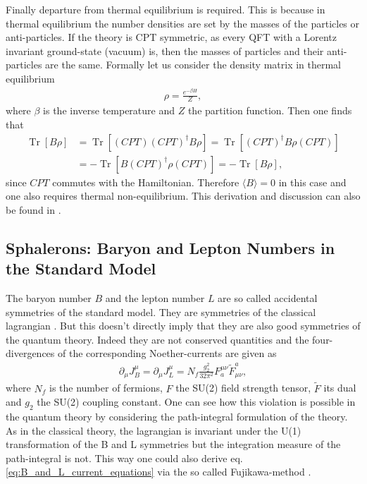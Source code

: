 \documentclass[13pt,a4paper,titlepage]{article}
\newcommand{\Tr}{\operatorname{Tr}}
\begin{document}
\noindent
Finally departure from thermal equilibrium is required. This is because in thermal equilibrium the number densities are set by the
masses of the particles or anti-particles. If the theory is CPT symmetric, as every QFT with a Lorentz invariant ground-state (vacuum) is, then the
masses of particles and their anti-particles are the same. %
Formally let us consider the density matrix in thermal equilibrium
\begin{align}
    \rho = \frac{e^{- \beta H}}{Z},
\end{align}
where $\beta$ is the inverse temperature and $Z$ the partition function.
Then one finds that
\begin{align}
    \Tr [ B \rho ] &=  \Tr [ (CPT) (CPT)^\dagger B \rho ] = \Tr [ (CPT)^\dagger B \rho (CPT) ]  \\
                   &= - \Tr [ B (CPT)^\dagger \rho (CPT) ] = - \Tr [ B \rho ],
\end{align}
since $CPT$ commutes with the Hamiltonian. Therefore $\langle B \rangle = 0$ in this case and one also requires thermal non-equilibrium. This derivation and discussion can also be found in \cite[sec. II]{Trodden:2004mj_baryogenesis_and_leptogenesis}.


\subsection{Sphalerons: Baryon and Lepton Numbers in the Standard Model}
\label{sec:sphaelrons}

The baryon number $B$ and the lepton number $L$ are so called accidental
symmetries of the standard model. They are symmetries of the classical lagrangian
\cite[part II.B]{Trodden:2004mj_baryogenesis_and_leptogenesis}.
But this doesn't directly imply that they are also good symmetries of the
quantum theory. Indeed they are not conserved quantities and the four-divergences
of the corresponding Noether-currents are given as \cite[eq. 2.1]{Cline:2006ts_Baryogenesis}
\begin{align}
    \label{eq:B_and_L_current_equations}
    \partial_\mu J^\mu_B = \partial_\mu J^\mu_L = N_f \frac{g_2^2}{32 \pi^2} F^{\mu \nu}_a \tilde{F}_{\mu \nu}^a,
\end{align}
where $N_f$ is the number of fermions, $F$ the SU(2) field strength tensor, $\tilde{F}$ its dual and $g_2$ the SU(2) coupling constant.
One can see how this violation is possible in the quantum theory by considering the path-integral formulation of the theory.
As in the classical theory, the lagrangian is invariant under the U(1) transformation of the B and L symmetries but the integration measure of the path-integral is not. This way one could also derive eq. \eqref{eq:B_and_L_current_equations} via the so called Fujikawa-method \cite{Fujikawa_method_PhysRevD.21.2848}.
\end{document}

